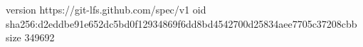 version https://git-lfs.github.com/spec/v1
oid sha256:d2eddbe91e652dc5bd0f12934869f6dd8bd4542700d25834aee7705c37208cbb
size 349692

